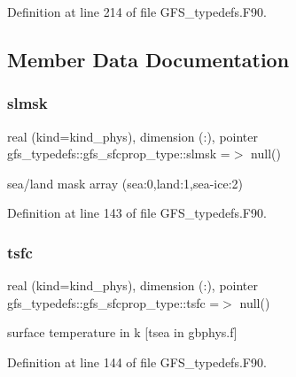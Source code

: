 Definition at line 214 of file G\+F\+S\+\_\+typedefs.\+F90.



\subsection{Member Data Documentation}
\mbox{\label{structgfs__typedefs_1_1gfs__sfcprop__type_a410ba9f686f679e5cf19286c30589c16}} 
\subsubsection{slmsk}
{\footnotesize\ttfamily real (kind=kind\+\_\+phys), dimension  (\+:), pointer gfs\+\_\+typedefs\+::gfs\+\_\+sfcprop\+\_\+type\+::slmsk =$>$ null()}



sea/land mask array (sea\+:0,land\+:1,sea-\/ice\+:2) 



Definition at line 143 of file G\+F\+S\+\_\+typedefs.\+F90.

\mbox{\label{structgfs__typedefs_1_1gfs__sfcprop__type_ae0963f422377d88bc7b7e37cada2a492}} 
\subsubsection{tsfc}
{\footnotesize\ttfamily real (kind=kind\+\_\+phys), dimension   (\+:), pointer gfs\+\_\+typedefs\+::gfs\+\_\+sfcprop\+\_\+type\+::tsfc =$>$ null()}



surface temperature in k [tsea in gbphys.\+f] 



Definition at line 144 of file G\+F\+S\+\_\+typedefs.\+F90.

\mbox{\label{structgfs__typedefs_1_1gfs__sfcprop__type_aa1ea34430568dd5951bcc4e743876ddc}} 
